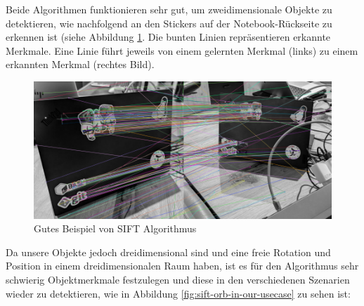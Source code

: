 Beide Algorithmen funktionieren sehr gut, um zweidimensionale Objekte zu detektieren, wie nachfolgend an den Stickers auf der Notebook-Rückseite zu erkennen ist (siehe Abbildung \ref{fig:good-sift-example}. Die bunten Linien repräsentieren erkannte Merkmale. Eine Linie führt jeweils von einem gelernten Merkmal (links) zu einem erkannten Merkmal (rechtes Bild).

\begin{figure}[H]
    \centering
    \includegraphics[width=1\linewidth]{assets/informatik-prototyp/opencv/sift/sift_good_example.png}
    \caption{Gutes Beispiel von SIFT Algorithmus}
    \label{fig:good-sift-example}
\end{figure}

Da unsere Objekte jedoch dreidimensional sind und eine freie Rotation und Position in einem dreidimensionalen Raum haben, ist es für den Algorithmus sehr schwierig Objektmerkmale festzulegen und diese in den verschiedenen Szenarien wieder zu detektieren, wie in Abbildung \ref{fig:sift-orb-in-our-usecase} zu sehen ist:

